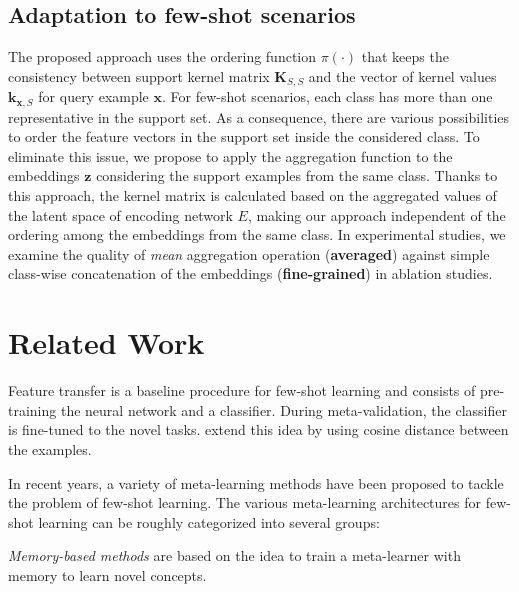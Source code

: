\documentclass[nohyperref]{article}
\theoremstyle{plain}
\theoremstyle{definition}
\theoremstyle{remark}
\begin{document}
\subsection{Adaptation to few-shot scenarios}

The proposed approach uses the ordering function $\pi(\cdot)$ that keeps the consistency between support kernel matrix $\mathbf{K}_{S,S}$ and the vector of kernel values $\mathbf{k}_{\mathbf{x}, S}$ for query example $\mathbf{x}$. For few-shot scenarios, each class has more than one representative in the support set. As a consequence, there are various possibilities to order the feature vectors in the support set inside the considered class. To eliminate this issue, we propose to apply the aggregation function to the embeddings $\mathbf{z}$ considering the support examples from the same class. Thanks to this approach, the kernel matrix is calculated based on the aggregated values of the latent space of encoding network $E$, making our approach independent of the ordering among the embeddings from the same class. In experimental studies, we examine the quality of \emph{mean} aggregation operation (\textbf{averaged}) against simple class-wise concatenation of the embeddings (\textbf{fine-grained}) in ablation studies. 




\section{Related Work}

Feature transfer \cite{zhuang2020comprehensive} is a baseline procedure for few-shot learning and consists of pre-training the neural network and a classifier. During meta-validation, the classifier is fine-tuned to the novel tasks. \cite{chen2019closer} extend this idea by using cosine distance between the examples. 

In recent years, a variety of meta-learning methods \cite{hospedales2020metalearning,schmidhuber1992fast,bengio1992optimization} have been proposed to tackle the problem of few-shot learning. The various meta-learning architectures for few-shot learning can be roughly categorized into several groups: 

{\em Memory-based methods} \cite{ravi2016optimization,munkhdalai2018rapid,santoro2016meta,mishra2018simple,munkhdalai2017meta,zhen2020learning} are based on the idea to train a meta-learner with memory to learn novel concepts.
\end{document}
